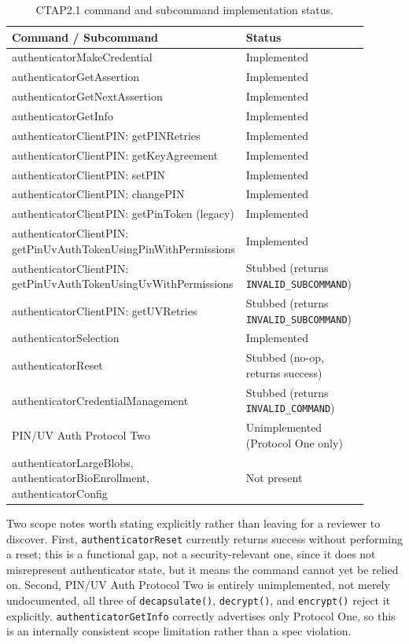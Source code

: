 \begin{table}[t]
\centering
\caption{CTAP2.1 command and subcommand implementation status.}
\label{tab:scope}
\small
\begin{tabular}{@{}p{0.52\linewidth} p{0.38\linewidth}@{}}
\toprule
\textbf{Command / Subcommand} & \textbf{Status} \\
\midrule
authenticatorMakeCredential & Implemented \\
authenticatorGetAssertion & Implemented \\
authenticatorGetNextAssertion & Implemented \\
authenticatorGetInfo & Implemented \\
authenticatorClientPIN: getPINRetries & Implemented \\
authenticatorClientPIN: getKeyAgreement & Implemented \\
authenticatorClientPIN: setPIN & Implemented \\
authenticatorClientPIN: changePIN & Implemented \\
authenticatorClientPIN: getPinToken (legacy) & Implemented \\
authenticatorClientPIN: getPinUvAuthTokenUsingPinWithPermissions & Implemented \\
authenticatorClientPIN: getPinUvAuthTokenUsingUvWithPermissions & Stubbed (returns \texttt{INVALID\_SUBCOMMAND}) \\
authenticatorClientPIN: getUVRetries & Stubbed (returns \texttt{INVALID\_SUBCOMMAND}) \\
authenticatorSelection & Implemented \\
authenticatorReset & Stubbed (no-op, returns success) \\
authenticatorCredentialManagement & Stubbed (returns \texttt{INVALID\_COMMAND}) \\
PIN/UV Auth Protocol Two & Unimplemented (Protocol One only) \\
authenticatorLargeBlobs, authenticatorBioEnrollment, authenticatorConfig & Not present \\
\bottomrule
\end{tabular}
\end{table}

Two scope notes worth stating explicitly rather than leaving for a reviewer to discover. First, \texttt{authenticatorReset} currently returns success without performing a reset; this is a functional gap, not a security-relevant one, since it does not misrepresent authenticator state, but it means the command cannot yet be relied on. Second, PIN/UV Auth Protocol Two is entirely unimplemented, not merely undocumented, all three of \texttt{decapsulate()}, \texttt{decrypt()}, and \texttt{encrypt()} reject it explicitly. \texttt{authenticatorGetInfo} correctly advertises only Protocol One, so this is an internally consistent scope limitation rather than a spec violation.


